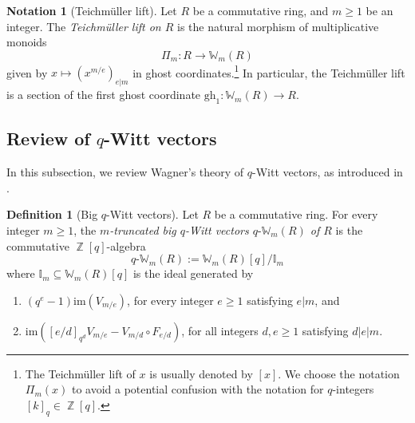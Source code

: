 \documentclass[10pt,twoside]{scrarticle}
\theoremstyle{definition}
\newtheorem{definition}[theorem]{Definition}
\newtheorem{notation}[theorem]{Notation}
\DeclareMathOperator{\Z}{\mathbb{Z}}
\newcommand{\W}{\mathbb{W}}
\newcommand{\qWm}{q\text{-}\mathbb{W}_m}
\newcommand{\gh}{\mathrm{gh}}
\renewcommand{\ge}{\geqslant}
\numberwithin{equation}{theorem}
\begin{document}
\begin{notation}[Teichmüller lift]\label{notationteichmullerlift}
    Let $R$ be a commutative ring, and $m \ge 1$ be an integer. The \emph{Teichmüller lift on $R$} is the natural morphism of multiplicative monoids
    $$\Pi_m : R \longrightarrow \W_m(R)$$
    given by $x \mapsto (x^{m/e})_{e|m}$ in ghost coordinates.\footnote{The Teichmüller lift of $x$ is usually denoted by $[x]$. We choose the notation $\Pi_m(x)$ to avoid a potential confusion with the notation for $q$-integers $[k]_q \in \Z[q]$.} In particular, the Teichmüller lift is a section of the first ghost coordinate $\gh_1 : \W_m(R) \rightarrow R$.
\end{notation}

\subsection{Review of $q$-Witt vectors}

In this subsection, we review Wagner's theory of $q$-Witt vectors, as introduced in \cite[Section~2]{wagner_q-witt_2024}.

\begin{definition}[Big $q$-Witt vectors]\label{definitionqbigWittvectors}
    Let $R$ be a commutative ring. For every integer $m \ge 1$, the \emph{$m$-truncated big $q$-Witt vectors $\qWm(R)$ of $R$} is the commutative $\Z[q]$-algebra
    $$\qWm(R) := \W_m(R)[q]/\mathbb{I}_m$$
    where $\mathbb{I}_m \subseteq \W_m(R)[q]$ is the ideal generated by
    \begin{enumerate}[label=(\roman*)]
        \item $(q^e-1)\text{im}(V_{m/e})$, for every integer $e \ge 1$ satisfying $e|m$, and
        \item $\text{im}([e/d]_{q^d} V_{m/e} - V_{m/d} \circ F_{e/d})$, for all integers $d,e \ge 1$ satisfying $d|e|m$.
    \end{enumerate}
\end{definition}
\end{document}
